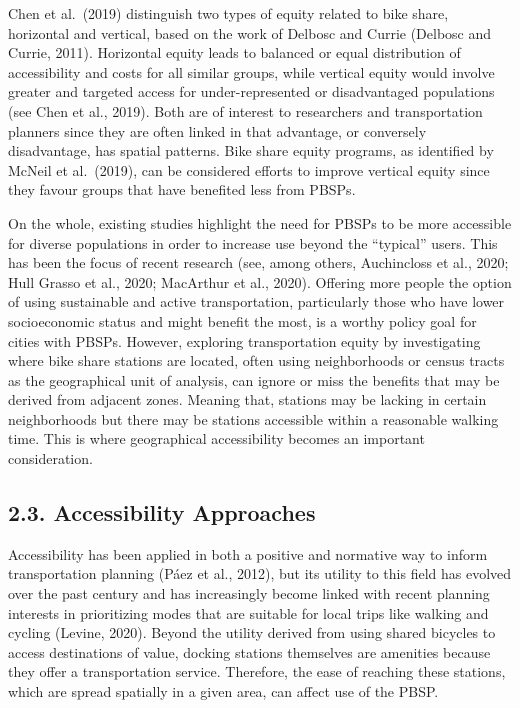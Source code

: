 \documentclass[]{elsarticle} %
\begin{document}
Chen et al.~(2019) distinguish two types of equity related to bike
share, horizontal and vertical, based on the work of Delbosc and Currie
(Delbosc and Currie, 2011). Horizontal equity leads to balanced or equal
distribution of accessibility and costs for all similar groups, while
vertical equity would involve greater and targeted access for
under-represented or disadvantaged populations (see Chen et al., 2019).
Both are of interest to researchers and transportation planners since
they are often linked in that advantage, or conversely disadvantage, has
spatial patterns. Bike share equity programs, as identified by McNeil et
al.~(2019), can be considered efforts to improve vertical equity since
they favour groups that have benefited less from PBSPs.

On the whole, existing studies highlight the need for PBSPs to be more
accessible for diverse populations in order to increase use beyond the
``typical'' users. This has been the focus of recent research (see,
among others, Auchincloss et al., 2020; Hull Grasso et al., 2020;
MacArthur et al., 2020). Offering more people the option of using
sustainable and active transportation, particularly those who have lower
socioeconomic status and might benefit the most, is a worthy policy goal
for cities with PBSPs. However, exploring transportation equity by
investigating where bike share stations are located, often using
neighborhoods or census tracts as the geographical unit of analysis, can
ignore or miss the benefits that may be derived from adjacent zones.
Meaning that, stations may be lacking in certain neighborhoods but there
may be stations accessible within a reasonable walking time. This is
where geographical accessibility becomes an important consideration.

\hypertarget{accessibility-approaches}{%
\subsection{2.3. Accessibility
Approaches}\label{accessibility-approaches}}

Accessibility has been applied in both a positive and normative way to
inform transportation planning (Páez et al., 2012), but its utility to
this field has evolved over the past century and has increasingly become
linked with recent planning interests in prioritizing modes that are
suitable for local trips like walking and cycling (Levine, 2020). Beyond
the utility derived from using shared bicycles to access destinations of
value, docking stations themselves are amenities because they offer a
transportation service. Therefore, the ease of reaching these stations,
which are spread spatially in a given area, can affect use of the PBSP.
\end{document}

